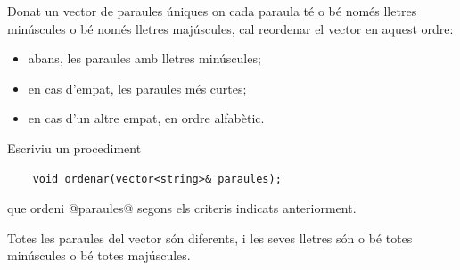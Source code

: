 


\Statement

Donat un vector de paraules úniques
on cada paraula té o bé només lletres minúscules o bé només lletres majúscules,
cal reordenar el vector en aquest ordre:
\begin{itemize}
\item
abans, les paraules amb lletres minúscules;
\item
en cas d'empat, les paraules més curtes;
\item
en cas d'un altre empat, en ordre alfabètic.
\end{itemize}

\medskip

Escriviu un procediment

\begin{lstlisting}
    void ordenar(vector<string>& paraules);
\end{lstlisting}

que ordeni @paraules@
segons els criteris indicats anteriorment.


\Precondition

Totes les paraules del vector són diferents,
i les seves lletres són o bé totes minúscules o bé totes majúscules.


\ObservationNoMain
